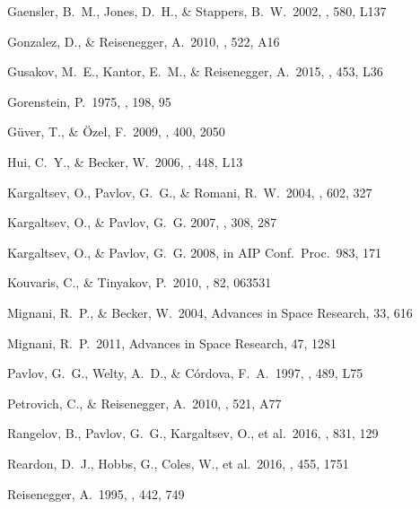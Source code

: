 \documentclass[iop]{emulateapj}
\begin{document}
\begin{thebibliography}{}
 Gaensler, B.~M., Jones, D.~H., \& Stappers, B.~W.\ 2002, \apjl, 580, L137 

 Gonzalez, D., \& Reisenegger, A.\ 2010, \aap, 522, A16 

 Gusakov, M.~E., Kantor, E.~M., \& Reisenegger, A.\ 2015, \mnras, 453, L36 

 Gorenstein, P.\ 1975, \apj, 198, 95 

 G{\"u}ver, T., {\& \"O}zel, F.\ 2009, \mnras, 400, 2050 

 Hui, C.~Y., \& Becker, W.\ 2006, \aap, 448, L13 

 Kargaltsev, O., Pavlov, G.~G., \& Romani, R.~W.\ 2004, \apj, 602, 327 

 Kargaltsev, O., \& Pavlov, G.\ G. 2007, \apss, 308, 287 

 Kargaltsev, O., \& Pavlov, G.\ G. 2008, in AIP Conf.\ Proc.\ 983, 171

 Kouvaris, C., \& Tinyakov, P.\ 2010, \prd, 82, 063531 

 Mignani, R.~P., \& Becker, W.\ 2004, Advances in Space Research, 33, 616 

 Mignani, R.~P.\ 2011, Advances  in Space Research, 47, 1281

 Pavlov, G.~G., Welty, A.~D., \& C{\'o}rdova, F.~A.\ 1997, \apjl, 489, L75 

 Petrovich, C., \& Reisenegger, A.\ 2010, \aap, 521, A77 

 Rangelov, B., Pavlov, G.~G., Kargaltsev, O., et al.\ 2016, \apj, 831, 129 


 Reardon, D.~J., Hobbs, G., Coles, W., et al.\ 2016, \mnras, 455, 1751

 Reisenegger, A.\ 1995, \apj, 442, 749 


\end{thebibliography}
\end{document}
